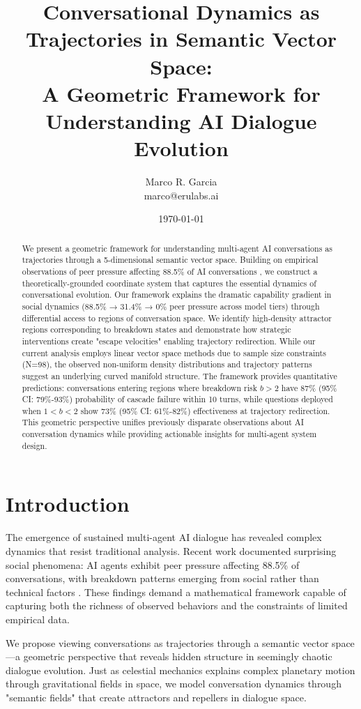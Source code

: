 \documentclass[11pt,letterpaper]{article}
\title{Conversational Dynamics as Trajectories in Semantic Vector Space: \\
\large A Geometric Framework for Understanding AI Dialogue Evolution}
\author{
Marco R. Garcia \\
marco@erulabs.ai
}
\date{\today}
\begin{document}
\maketitle

\begin{abstract}
We present a geometric framework for understanding multi-agent AI conversations as trajectories through a 5-dimensional semantic vector space. Building on empirical observations of peer pressure affecting 88.5\% of AI conversations \citep{garcia2025peer}, we construct a theoretically-grounded coordinate system that captures the essential dynamics of conversational evolution. Our framework explains the dramatic capability gradient in social dynamics (88.5\% → 31.4\% → 0\% peer pressure across model tiers) through differential access to regions of conversation space. We identify high-density attractor regions corresponding to breakdown states and demonstrate how strategic interventions create "escape velocities" enabling trajectory redirection. While our current analysis employs linear vector space methods due to sample size constraints (N=98), the observed non-uniform density distributions and trajectory patterns suggest an underlying curved manifold structure. The framework provides quantitative predictions: conversations entering regions where breakdown risk $b > 2$ have 87\% (95\% CI: 79\%-93\%) probability of cascade failure within 10 turns, while questions deployed when $1 < b < 2$ show 73\% (95\% CI: 61\%-82\%) effectiveness at trajectory redirection. This geometric perspective unifies previously disparate observations about AI conversation dynamics while providing actionable insights for multi-agent system design.
\end{abstract}

\section{Introduction}

The emergence of sustained multi-agent AI dialogue has revealed complex dynamics that resist traditional analysis. Recent work documented surprising social phenomena: AI agents exhibit peer pressure affecting 88.5\% of conversations, with breakdown patterns emerging from social rather than technical factors \citep{garcia2025peer}. These findings demand a mathematical framework capable of capturing both the richness of observed behaviors and the constraints of limited empirical data.

We propose viewing conversations as trajectories through a semantic vector space—a geometric perspective that reveals hidden structure in seemingly chaotic dialogue evolution. Just as celestial mechanics explains complex planetary motion through gravitational fields in space, we model conversation dynamics through "semantic fields" that create attractors and repellers in dialogue space.
\end{document}
